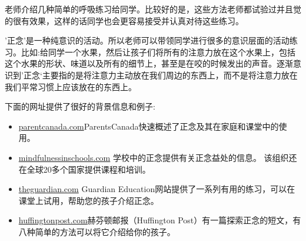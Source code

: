    老师介绍几种简单的呼吸练习给同学。比较好的是，这些方法老师都试验过并且觉的很有效果，这样的话同学也会更容易接受并认真对待这些练习。\par
   '正念'是一种纯意识的活动。所以老师可以带领同学进行很多的意识层面的活动练习。比如:给同学一个水果，然后让孩子们将所有的注意力放在这个水果上，包括这个水果的形状、味道以及所有的细节上，甚至是在咬的时候发出的声音。逐渐意识到’正念‘主要指的是将注意力主动放在我们周边的东西上，而不是将注意力放在我们平常习惯上应该放在的东西上。\par
   下面的网址提供了很好的背景信息和例子:  \par
   \begin{itemize}
     \item \href{http://www.parentscanada.com/school/tweens/teaching-your-tweenmindfulness}{parentcanada.com}ParentsCanada快速概述了正念及其在家庭和课堂中的使用。
     \item \href{http://mindfulnessinschools.org/mindfulness/}{mindfulnessinschools.com} 学校中的正念提供有关正念益处的信息。 该组织还在全球20多个国家提供课程和培训。
     \item \href{http://www.theguardian.com/education/teacher-blog/2013/jun/24/mindfulness-classroom-teaching-resource}{theguardian.com} Guardian Education网站提供了一系列有用的练习，可以在课堂上试用，帮助您的孩子介绍正念。
     \item \href{http://www.huffingtonpost.com/sarah-rudell-beach-/8-ways-to-teachmindfulness-to-kids_b_5611721.html}{huffingtonpost.com}赫芬顿邮报（Huffington Post）有一篇探索正念的短文，有八种简单的方法可以将它介绍给你的孩子。       
   \end{itemize}  




